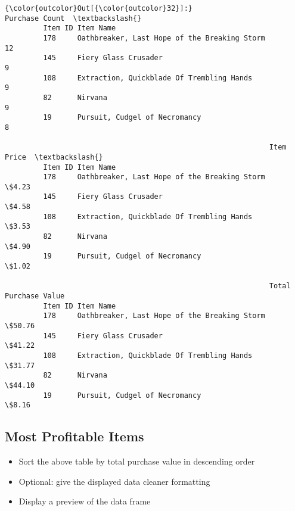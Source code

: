 \documentclass[11pt]{article}
\begin{document}
\begin{Verbatim}[commandchars=\\\{\}]
{\color{outcolor}Out[{\color{outcolor}32}]:}                                                       Purchase Count  \textbackslash{}
         Item ID Item Name                                                      
         178     Oathbreaker, Last Hope of the Breaking Storm              12   
         145     Fiery Glass Crusader                                       9   
         108     Extraction, Quickblade Of Trembling Hands                  9   
         82      Nirvana                                                    9   
         19      Pursuit, Cudgel of Necromancy                              8   
         
                                                              Item Price  \textbackslash{}
         Item ID Item Name                                                 
         178     Oathbreaker, Last Hope of the Breaking Storm      \$4.23   
         145     Fiery Glass Crusader                              \$4.58   
         108     Extraction, Quickblade Of Trembling Hands         \$3.53   
         82      Nirvana                                           \$4.90   
         19      Pursuit, Cudgel of Necromancy                     \$1.02   
         
                                                              Total Purchase Value  
         Item ID Item Name                                                          
         178     Oathbreaker, Last Hope of the Breaking Storm               \$50.76  
         145     Fiery Glass Crusader                                       \$41.22  
         108     Extraction, Quickblade Of Trembling Hands                  \$31.77  
         82      Nirvana                                                    \$44.10  
         19      Pursuit, Cudgel of Necromancy                               \$8.16  
\end{Verbatim}
            
    \subsection{Most Profitable Items}\label{most-profitable-items}

    \begin{itemize}
\item
  Sort the above table by total purchase value in descending order
\item
  Optional: give the displayed data cleaner formatting
\item
  Display a preview of the data frame
\end{itemize}
\end{document}
